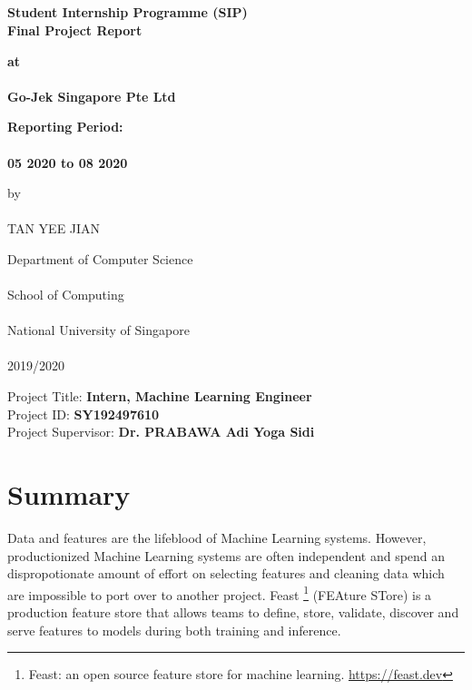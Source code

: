 \documentclass[a4paper, 12pt, fleqn]{report}
\begin{document}
\section*{}
\thispagestyle{plain}
    \begin{center}

        \Large
        \textbf{Student Internship Programme (SIP) \\
        Final Project Report}

        \vspace{2cm}
        \large
        \textbf{at \\
        \ \\ Go-Jek Singapore Pte Ltd}

        \vspace{1cm}
        \normalsize
        \textbf{Reporting Period: \\
        \ \\ 05 2020 to 08 2020}

        \vspace{1cm}
        by \\
        \ \\ TAN YEE JIAN

        \vfill

        Department of Computer Science \\
        \ \\ School of Computing \\
        \ \\ National University of Singapore \\
        \ \\ 2019/2020

        \vspace{1cm}
        Project Title: \textbf{Intern, Machine Learning Engineer}\\
        Project ID: \textbf{SY192497610}\\
        Project Supervisor: \textbf{Dr. PRABAWA Adi Yoga Sidi}
        \vspace{1cm}
    \end{center}


\chapter*{Summary}


Data and features are the lifeblood of Machine Learning systems. However,
productionized Machine Learning systems are often independent and spend an
dispropotionate amount of effort on selecting features and cleaning data which
are impossible to port over to another project. Feast \footnote{Feast: an open
  source feature store for machine learning. \url{https://feast.dev}} (FEAture STore) is a
production feature store that allows teams to define, store, validate, discover
and serve features to models during both training and inference.
\newline
\end{document}

